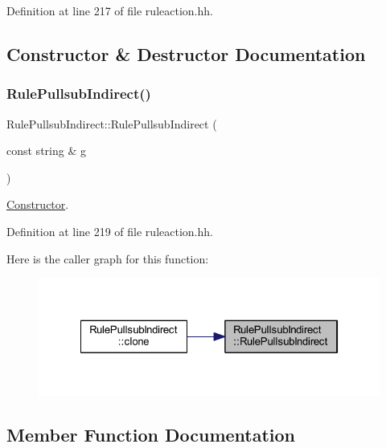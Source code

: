 Definition at line 217 of file ruleaction.\+hh.



\subsection{Constructor \& Destructor Documentation}
\mbox{\label{class_rule_pullsub_indirect_a4ea9d02ce15688fa6c78de8602e9da65}} 
\subsubsection{\texorpdfstring{RulePullsubIndirect()}{RulePullsubIndirect()}}
{\footnotesize\ttfamily Rule\+Pullsub\+Indirect\+::\+Rule\+Pullsub\+Indirect (\begin{DoxyParamCaption}\item[{const string \&}]{g }\end{DoxyParamCaption})\hspace{0.3cm}{\ttfamily [inline]}}



\mbox{\hyperlink{class_constructor}{Constructor}}. 



Definition at line 219 of file ruleaction.\+hh.

Here is the caller graph for this function\+:
\nopagebreak
\begin{figure}[H]
\begin{center}
\leavevmode
\includegraphics[width=322pt]{class_rule_pullsub_indirect_a4ea9d02ce15688fa6c78de8602e9da65_icgraph}
\end{center}
\end{figure}


\subsection{Member Function Documentation}
\mbox{\label{class_rule_pullsub_indirect_ae8c0c6b22bd0890c5b9ef806ceb91e58}} 
